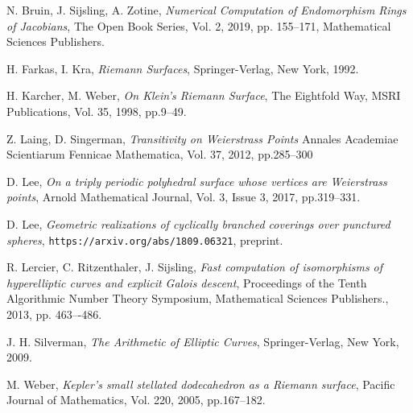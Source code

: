 \documentclass[12pt,reqno]{amsart}
\theoremstyle{definition}
\theoremstyle{remark}
\begin{document}






\begin{thebibliography}{20}


N. Bruin, J. Sijsling, A. Zotine,
\textit{Numerical Computation of Endomorphism Rings of Jacobians},
The Open Book Series,
Vol. 2, 2019, pp. 155--171, Mathematical Sciences Publishers.

H. Farkas, I. Kra,
\textit{Riemann Surfaces},
Springer-Verlag, New York, 1992.

H. Karcher, M. Weber,
\textit{On Klein's Riemann Surface},
The Eightfold Way, MSRI Publications, 
Vol. 35, 1998, pp.9--49.

Z. Laing, D. Singerman,
\textit{Transitivity on Weierstrass Points}
Annales Academiae Scientiarum Fennicae Mathematica,
Vol. 37, 2012, pp.285--300

D. Lee,
\textit{On a triply periodic polyhedral surface whose vertices are Weierstrass points},
Arnold Mathematical Journal, 
Vol. 3, Issue 3, 2017, pp.319--331.

D. Lee, 
\textit{Geometric realizations of cyclically branched coverings over punctured spheres},
\texttt{https://arxiv.org/abs/1809.06321}, preprint.

R. Lercier, C. Ritzenthaler, J. Sijsling,
\textit{Fast computation of isomorphisms of hyperelliptic curves and explicit Galois descent},
Proceedings of the Tenth Algorithmic Number Theory Symposium, Mathematical Sciences Publishers.,
2013, pp. 463–-486.

J. H. Silverman,
\textit{The Arithmetic of Elliptic Curves},
Springer-Verlag, New York, 2009.

M. Weber,
\textit{Kepler's small stellated dodecahedron as a Riemann surface},
Pacific Journal of Mathematics, 
Vol. 220, 2005, pp.167--182.


\end{thebibliography}
\end{document}
